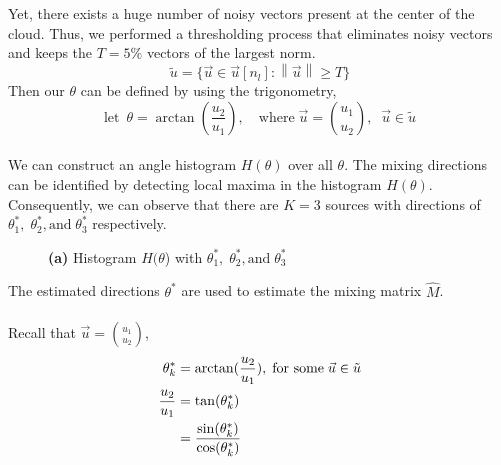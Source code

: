 \documentclass[a4paper,11pt]{article}
\begin{document}
\noindent Yet, there exists a huge number of noisy vectors present at the center of the cloud. 
Thus, we performed a thresholding process that eliminates noisy vectors and keeps the $T=5\%$ vectors of the largest norm. 
\\
\begin{equation}
    \tilde{u} = \{\vec{u} \in \vec{u}[n_l]:\left\lVert \vec{u}\right\rVert \geq T \}
\end{equation}
Then our $\theta$ can be defined by using the trigonometry,
\begin{equation}
    \text{let} \ \; \theta = \arctan(\frac{u_2}{u_1}), \quad \text{where} \; \vec{u} = \binom{u_1}{u_2}, \;\; \vec{u} \in \tilde{u}
\end{equation}
\\
We can construct an angle histogram $H(\theta)$ over all $\theta$. The mixing directions can be identified by detecting local maxima in the histogram $H(\theta)$. Consequently, we can observe that there are $K=3$ sources with directions of $\theta^{*}_1, \; \theta^{*}_2, \text{and} \;\theta^{*}_3$ respectively.


\begin{figure}[H]
\centering
{}
\caption{ \textbf{(a)} Histogram $H(\theta$) with $\theta^{*}_1, \; \theta^{*}_2, \text{and} \;\theta^{*}_3$ }
\end{figure}

\noindent The estimated directions $\theta^{*}$ are used to estimate the mixing matrix $\hat{M}$. 
\\
\\
Recall that $\vec{u} = \binom{u_1}{u_2}$,
\[
\begin{split}
    \theta^*_k & = \arctan(\frac{u_2}{u_1}), \; \text{for some} \; \vec{u} \in \Tilde{u} \\
    \frac{u_2}{u_1} & = \tan(\theta^*_k) \\
    & = \frac{\sin(\theta^*_k)}{\cos(\theta^*_k)}
\end{split}
\]
\end{document}
